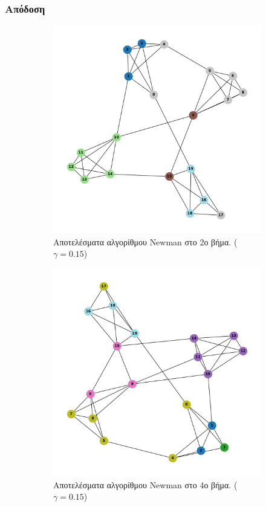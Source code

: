 \documentclass[12pt, letterpaper]{article}
\begin{document}
\subsubsection{Απόδοση}



\begin{figure}
  \begin{subfigure}{0.5\textwidth}
    \centering
    \includegraphics[width=0.6\linewidth]{iterations=1newman.pdf}
    \caption{Αποτελέσματα αλγορίθμου \textlatin{Newman} στο 2ο βήμα. ($\gamma=0.15$)}
    \label{fig:it1new}
  \end{subfigure}
  \begin{subfigure}{0.5\textwidth}
    \centering
    \includegraphics[width=0.6\linewidth]{iterations=3newman.pdf}
    \caption{Αποτελέσματα αλγορίθμου \textlatin{Newman} στο 4ο βήμα. ($\gamma = 0.15$)}
    \label{fig:it3new}
  \end{subfigure}
  \caption{}
  \label{new_1}
\end{figure}
\end{document}
